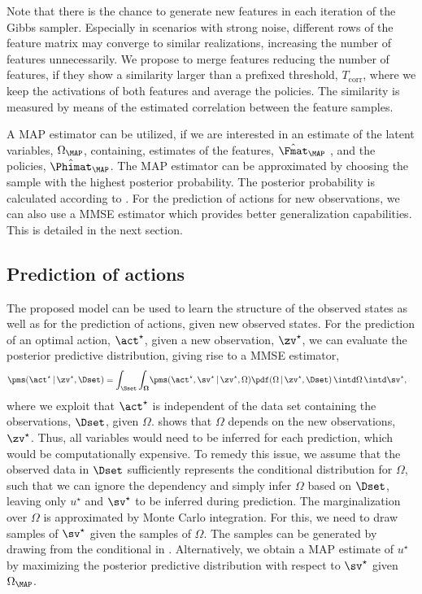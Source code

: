\documentclass{article}
\begin{document}
Note that there is the chance to generate new features in each iteration of the Gibbs sampler. 
Especially in scenarios with strong noise, different rows of the feature matrix may converge to similar realizations, increasing the number of features unnecessarily. 
We propose to merge features reducing the number of features, if they show a similarity larger than a prefixed threshold, $T_\text{corr}$, where we keep the activations of both features and average the policies.
The similarity is measured by means of the estimated correlation between the feature samples.
 
A \ac{MAP} estimator can be utilized, if we are interested in an estimate of the latent variables, $\Omega_{\MAP}$, containing, \ia estimates of the features, $\hat{\Fmat}_\MAP$ \cite{Rai2011}, and the policies, $\hat{\Phimat}_\MAP$.
The \ac{MAP} estimator can be approximated by choosing the sample with the highest posterior probability. 
The posterior probability is calculated according to . 
For the prediction of actions for new observations, we can also use a \ac{MMSE} estimator which provides better generalization capabilities.
This is detailed in the next section.

\subsection{Prediction of actions}
\label{sec::dm::inf::prediction}
The proposed model can be used to learn the structure of the observed states as well as for the prediction of actions, given new observed states.
For the prediction of an optimal action, $\act^\star$, given a new observation, $\zv^\star$, we can evaluate the posterior predictive distribution, giving rise to a \ac{MMSE} estimator,
\begin{align} 
 \begin{split}   
 \pms(\act^\star \,|\, & \zv^\star, \Dset) 
					   = \int_{\Sset} \int_{\mathbf{\Omega}} \! \pms(\act^\star, \sv^\star \,|\, \zv^\star, \Omega) \pdf(\Omega \,|\, \zv^\star, \Dset) \, \intd\Omega \, \intd\sv^\star,
 \end{split}					  
  \label{eq::dm::post::pred}					  
\end{align}
where we exploit that $\act^\star$ is independent of the data set containing the observations, $\Dset$, given $\Omega$.
 shows that $\Omega$ depends on the new observations, $\zv^\star$. 
Thus, all variables would need to be inferred for each prediction, which would be computationally expensive. 
To remedy this issue, we assume that the observed data in $\Dset$ sufficiently represents the conditional distribution for $\Omega$, such that we can ignore the dependency and simply infer $\Omega$ based on $\Dset$, leaving only $u^\star$ and $\sv^\star$ to be inferred during prediction. 
The marginalization over $\Omega$ is approximated by Monte Carlo integration.
For this, we need to draw samples of $\sv^\star$ given the samples of $\Omega$. The samples can be generated by drawing from the conditional in .
Alternatively, we obtain a \ac{MAP} estimate of $u^\star$ by maximizing the posterior predictive distribution with respect to $\sv^\star$ given $\Omega_\MAP$.
\end{document}
